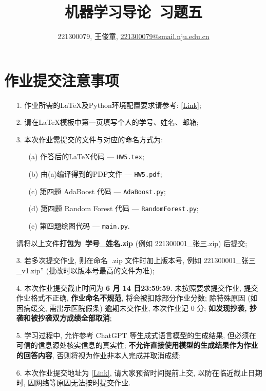 \documentclass[a4paper,UTF8]{article}
\numberwithin{equation}{section}
\theoremstyle{definition}
\begin{document}
\title{机器学习导论\ 习题五}
\author{221300079, 王俊童, \href{mailto:221300079@smail.nju.edu.cn}{221300079@smail.nju.edu.cn}}
\maketitle
\section*{作业提交注意事项}
\begin{tcolorbox}
	\begin{enumerate}
    \item[1.] 作业所需的LaTeX及Python环境配置要求请参考: \href{https://www.lamda.nju.edu.cn/ML2024Spring/supplemantary/environment.pdf}{[Link]};
		\item[2.] 请在LaTeX模板中第一页填写个人的学号、姓名、邮箱;
		\item[3.] 本次作业需提交的文件与对应的命名方式为:
            \begin{enumerate}
                \item [(a)] 作答后的LaTeX代码 --- \texttt{HW5.tex};
                \item [(b)] 由(a)编译得到的PDF文件 --- \texttt{HW5.pdf};
                \item [(c)] 第四题 AdaBoost 代码 --- \texttt{AdaBoost.py};
                \item [(d)] 第四题 Random Forest 代码 --- \texttt{RandomForest.py};
                \item [(e)] 第四题绘图代码 --- \texttt{main.py}.
            \end{enumerate}
            请将以上文件{\color{red}\textbf{打包为~学号\hspace{0em}\_\hspace{0em}姓名.zip}} (例如 221300001\hspace{0em}\_\hspace{0em}张三.zip) 后提交;
		\item[3.] 若多次提交作业, 则在命名~.zip 文件时加上版本号, 例如 221300001\_\hspace{0em}张三\hspace{0em}\_v1.zip” (批改时以版本号最高的文件为准);
		\item[4.] 本次作业提交截止时间为 {\color{red}\textbf{ 6 月 14 日23:59:59}}. 未按照要求提交作业, 提交作业格式不正确, {\color{red}\textbf{作业命名不规范}}, 将会被扣除部分作业分数; 除特殊原因 (如因病缓交, 需出示医院假条) 逾期未交作业, 本次作业记 0 分; {\color{red}\textbf{如发现抄袭, 抄袭和被抄袭双方成绩全部取消}};
        \item[5.] 学习过程中, 允许参考 ChatGPT 等生成式语言模型的生成结果, 但必须在可信的信息源处核实信息的真实性; {\color{red}\textbf{不允许直接使用模型的生成结果作为作业的回答内容}}, 否则将视为作业非本人完成并取消成绩;
		\item[6.] 本次作业提交地址为 \href{https://box.nju.edu.cn/u/d/06ad1043a3dd4ecebc80/}{[Link]}, 请大家预留时间提前上交, 以防在临近截止日期时, 因网络等原因无法按时提交作业.
	\end{enumerate}
\end{tcolorbox}
\newpage
\end{document}

